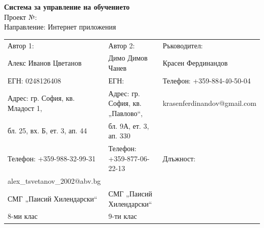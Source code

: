 \documentclass[12pt]{article}
\begin{document}
	\begin{center}
	\end{center}
	\vspace{1.5cm}
	\begin{center}
		\LARGE{\textbf{Система за управление на обучението}}\\\vspace{1.5cm}
		\Large{Проект №:}\\\vspace{1.5cm}
		\large{Направление: Интернет приложения}\\ \vspace{9.25cm}
		\begin{table}[ht]
			\centering
			\resizebox{\textwidth}{!}
			{
				\begin{tabular}{lll}
					Автор 1: & Автор 2: & Ръководител:\\
					Алекс Иванов Цветанов & Димо Димов Чанев & Красен Фердинандов\\
					ЕГН: 0248126408 & ЕГН: & Телефон: +359-884-40-50-04\\
					Адрес: гр. София, кв. Младост 1, &Адрес: гр. София, кв. „Павлово“, & krasenferdinandov@gmail.com\\
					бл. 25, вх. Б, ет. 3, ап. 44& бл. 9А, ет. 3, ап. 330 &\\
					Телефон: +359-988-32-99-31& Телефон: +359-877-06-22-13 & Длъжност:\\
					alex\_tsvetanov\_2002@abv.bg& &\\
					СМГ „Паисий Хилендарски“&СМГ „Паисий Хилендарски“ &\\
					8-ми клас&9-ти клас &\\
				\end{tabular}
			}
		\end{table}
	\end{center}
	
\end{document}
